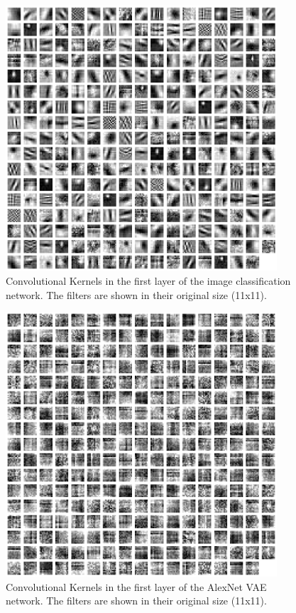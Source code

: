 \begin{figure}
    \centering
    \includegraphics[width=0.9\textwidth]{images/alexnet_classification_l1_kernels.png}
    \caption[Image classification - Layer 1 Kernels]{Convolutional Kernels in the first layer of the image classification network. The filters are shown in their original size (11x11).}
    \label{fig:classification_layer1_kernels}
\end{figure}

\begin{figure}
    \centering
    \includegraphics[width=0.9\textwidth]{images/alexnet_vae_l1_kernels.png}
    \caption[\ac{VAE} - Layer 1 Kernels]{Convolutional Kernels in the first layer of the AlexNet \ac{VAE} network. The filters are shown in their original size (11x11).}
    \label{fig:vae_layer1_kernels}
\end{figure}

